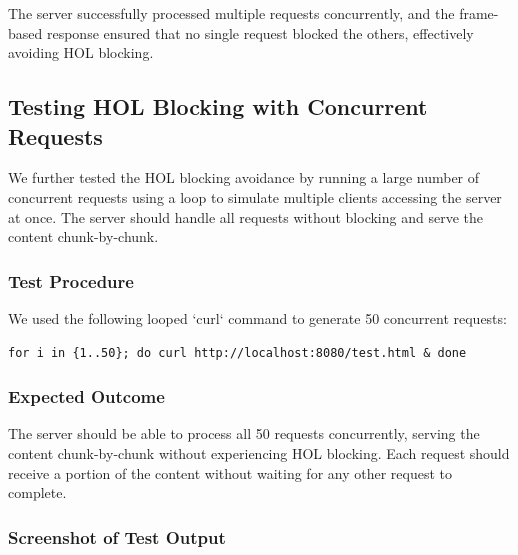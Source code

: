 \documentclass{article}
\begin{document}
The server successfully processed multiple requests concurrently, and the frame-based response ensured that no single request blocked the others, effectively avoiding HOL blocking.

\subsection*{Testing HOL Blocking with Concurrent Requests}

We further tested the HOL blocking avoidance by running a large number of concurrent requests using a loop to simulate multiple clients accessing the server at once. The server should handle all requests without blocking and serve the content chunk-by-chunk.

\subsubsection*{Test Procedure}

We used the following looped `curl` command to generate 50 concurrent requests:
\begin{lstlisting}
for i in {1..50}; do curl http://localhost:8080/test.html & done
\end{lstlisting}

\subsubsection*{Expected Outcome}

The server should be able to process all 50 requests concurrently, serving the content chunk-by-chunk without experiencing HOL blocking. Each request should receive a portion of the content without waiting for any other request to complete.

\subsubsection*{Screenshot of Test Output}
\end{document}
